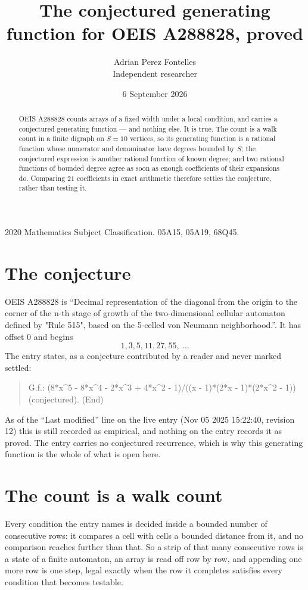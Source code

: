 \documentclass[11pt,a4paper]{article}
\title{The conjectured generating function for OEIS A288828, proved}
\author{Adrian Perez Fontelles\\ \small Independent researcher}
\date{6 September 2026}
\theoremstyle{plain}
\theoremstyle{definition}
\begin{document}
\maketitle

\begin{abstract}
OEIS A288828 counts arrays of a fixed width under a local condition, and carries a conjectured
generating function --- and nothing else. It is true. The count is a walk count in a finite
digraph on $S=10$ vertices, so its generating function is a rational function whose numerator
and denominator have degrees bounded by $S$; the conjectured expression is another rational
function of known degree; and two rational functions of bounded degree agree as soon as enough
coefficients of their expansions do. Comparing $21$ coefficients in exact arithmetic
therefore settles the conjecture, rather than testing it.
\end{abstract}

\noindent\small 2020 Mathematics Subject Classification. 05A15, 05A19, 68Q45.\normalsize

\section{The conjecture}

OEIS A288828 is ``Decimal representation of the diagonal from the origin to the corner of the n-th stage of growth of the two-dimensional cellular automaton defined by "Rule 515", based on the 5-celled von Neumann neighborhood.''. It has offset $0$ and begins
\[
1, 3, 5, 11, 27, 55,\ \dots
\]
The entry states, as a conjecture contributed by a reader and never marked settled:
\begin{quote}
G.f.: (8*x\^{}5 - 8*x\^{}4 - 2*x\^{}3 + 4*x\^{}2 - 1)/((x - 1)*(2*x - 1)*(2*x\^{}2 - 1)) (conjectured). (End)
\end{quote}
As of the ``Last modified'' line on the live entry (Nov 05 2025 15:22:40, revision 12) this is still
recorded as empirical, and nothing on the entry records it as proved. The entry carries no
conjectured recurrence, which is why this generating function is the whole of what is open
here.

\section{The count is a walk count}

Every condition the entry names is decided inside a bounded number of consecutive rows: it
compares a cell with cells a bounded distance from it, and no comparison reaches further than
that. So a strip of that many consecutive rows is a state of a finite automaton, an array is
read off row by row, and appending one more row is one step, legal exactly when the row it
completes satisfies every condition that becomes testable.
\end{document}
